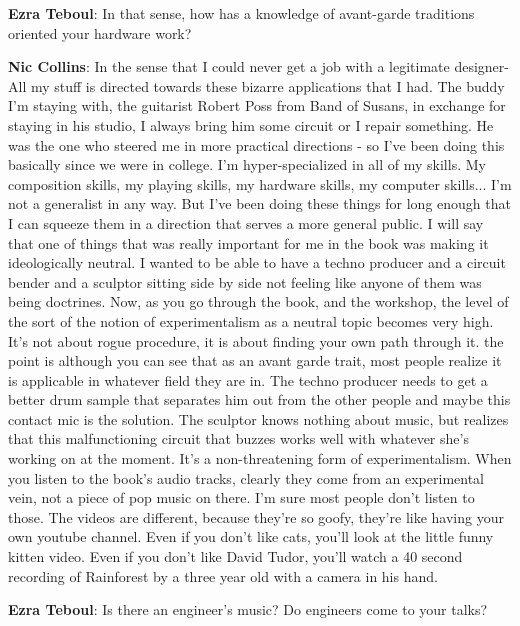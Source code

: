 \textbf{Ezra Teboul}: In that sense, how has a knowledge of avant-garde traditions oriented your hardware work?
					
\textbf{Nic Collins}: In the sense that I could never get a job with a legitimate designer- All my stuff is directed towards these bizarre applications that I had.  The buddy I’m staying with, the guitarist Robert Poss from Band of Susans, in exchange for staying in his studio, I always bring him some circuit or I repair something. He was the one who steered me in more practical directions - so I’ve been doing this basically since we were in college. I’m hyper-specialized in all of my skills. My composition skills, my playing skills, my hardware skills, my computer skills... I’m not a generalist in any way. But I’ve been doing these things for long enough that I can squeeze them in a direction that serves a more general public. I will say that one of things that was really important for me in the book was making it ideologically neutral. I wanted to be able to have a techno producer and a circuit bender and a sculptor sitting side by side not feeling like anyone of them was being doctrines. Now, as you go through the book, and the workshop, the level of the sort of the notion of experimentalism as a neutral topic becomes very high. It’s not  about rogue procedure, it is about finding your own path through it. the point is although you can see that as an avant garde trait, most people realize it is applicable in whatever field they are in. The techno producer needs to get a better drum sample that separates him out from the other people and maybe this contact mic is the solution. The sculptor knows nothing about music, but realizes that this malfunctioning circuit that buzzes works well with whatever she’s working on at the moment. It’s a non-threatening form of experimentalism. When you listen to the book’s audio tracks, clearly they come from an experimental vein, not a piece of pop music on there. I’m sure most people don’t listen to those. The videos are different, because they’re so goofy, they’re like having your own youtube channel. Even if you don’t like cats, you’ll look at the little funny kitten video. Even if you don’t like David Tudor, you’ll watch a 40 second recording of Rainforest by a three year old with a camera in his hand.
					
\textbf{Ezra Teboul}: Is there an engineer’s music? Do engineers come to your talks?
					
